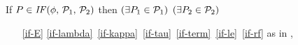 \begin{figure}
  \noindent
  If $\aPS \in \sIF{\aForm}\sTHEN\aPSS_1\sELSE\aPSS_2\sFI$ then
  $(\exists P_1\in\mathcal{P}_1)$ $(\exists P_2\in\mathcal{P}_2)$
  \begin{multicols}{2}
    \begin{enumerate}[topsep=0pt,label=(\textsc{i}\arabic*),ref=\textsc{i}\arabic*]
    \item[\eqref{if-E}]
      \eqref{if-lambda}\,
      \eqref{if-kappa}\,
      \eqref{if-tau}\,
      \eqref{if-term}\,
      \eqref{if-le}\, 
      \eqref{if-rf}
      as in ,
      \setcounter{enumi}{\value{le}}

\end{enumerate}
\end{multicols}
\end{figure}

